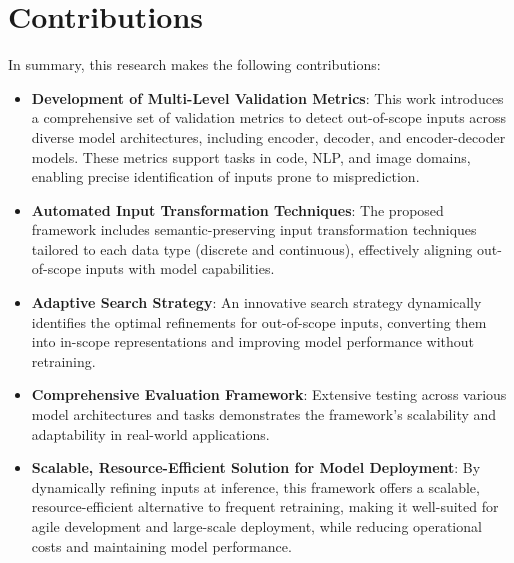 \section{Contributions}

In summary, this research makes the following contributions: 

\begin{itemize}
    \item \textbf{Development of Multi-Level Validation Metrics}: This work introduces a comprehensive set of validation metrics to detect out-of-scope inputs across diverse model architectures, including encoder, decoder, and encoder-decoder models. These metrics support tasks in code, NLP, and image domains, enabling precise identification of inputs prone to misprediction.
    \item \textbf{Automated Input Transformation Techniques}: The proposed framework includes semantic-preserving input transformation techniques tailored to each data type (discrete and continuous), effectively aligning out-of-scope inputs with model capabilities.
    \item \textbf{Adaptive Search Strategy}: An innovative search strategy dynamically identifies the optimal refinements for out-of-scope inputs, converting them into in-scope representations and improving model performance without retraining.
    \item \textbf{Comprehensive Evaluation Framework}: Extensive testing across various model architectures and tasks demonstrates the framework’s scalability and adaptability in real-world applications.
    \item \textbf{Scalable, Resource-Efficient Solution for Model Deployment}: By dynamically refining inputs at inference, this framework offers a scalable, resource-efficient alternative to frequent retraining, making it well-suited for agile development and large-scale deployment, while reducing operational costs and maintaining model performance.

\end{itemize}
